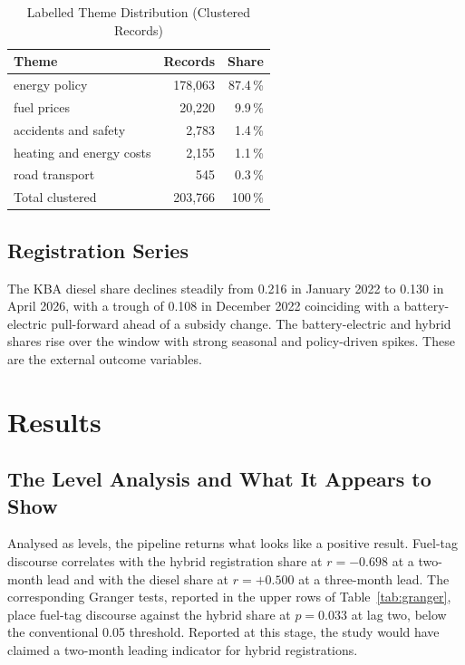 \documentclass[conference]{IEEEtran}
\begin{document}
\begin{table}[t]
\caption{Labelled Theme Distribution (Clustered Records)}
\label{tab:themes}
\centering \small
\begin{tabular}{@{}lrr@{}}
\toprule
\textbf{Theme} & \textbf{Records} & \textbf{Share} \\ \midrule
energy policy          & 178{,}063 & 87.4\,\% \\
fuel prices            & 20{,}220  & 9.9\,\% \\
accidents and safety   & 2{,}783   & 1.4\,\% \\
heating and energy costs & 2{,}155 & 1.1\,\% \\
road transport         & 545       & 0.3\,\% \\ \midrule
Total clustered        & 203{,}766 & 100\,\% \\
\bottomrule
\end{tabular}
\end{table}

\subsection{Registration Series}
The KBA diesel share declines steadily from 0.216 in January 2022 to 0.130 in
April 2026, with a trough of 0.108 in December 2022 coinciding with a
battery-electric pull-forward ahead of a subsidy change. The battery-electric
and hybrid shares rise over the window with strong seasonal and policy-driven
spikes. These are the external outcome variables.

\section{Results}
\subsection{The Level Analysis and What It Appears to Show}
Analysed as levels, the pipeline returns what looks like a positive result.
Fuel-tag discourse correlates with the hybrid registration share at $r=-0.698$
at a two-month lead and with the diesel share at $r=+0.500$ at a three-month
lead. The corresponding Granger tests, reported in the upper rows of
Table~\ref{tab:granger}, place fuel-tag discourse against the hybrid share at
$p=0.033$ at lag two, below the conventional 0.05 threshold. Reported at this
stage, the study would have claimed a two-month leading indicator for hybrid
registrations.
\end{document}
